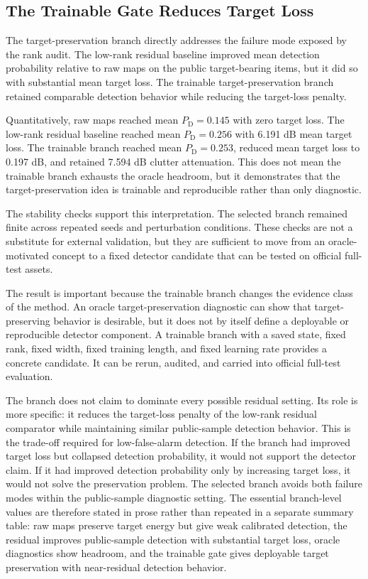 \documentclass[journal]{IEEEtran}
\begin{document}
\subsection{The Trainable Gate Reduces Target Loss}

The target-preservation branch directly addresses the failure mode exposed by the rank audit. The low-rank residual baseline improved mean detection probability relative to raw maps on the public target-bearing items, but it did so with substantial mean target loss. The trainable target-preservation branch retained comparable detection behavior while reducing the target-loss penalty.

Quantitatively, raw maps reached mean $P_{\mathrm{D}}=0.145$ with zero target loss. The low-rank residual baseline reached mean $P_{\mathrm{D}}=0.256$ with 6.191 dB mean target loss. The trainable branch reached mean $P_{\mathrm{D}}=0.253$, reduced mean target loss to 0.197 dB, and retained 7.594 dB clutter attenuation. This does not mean the trainable branch exhausts the oracle headroom, but it demonstrates that the target-preservation idea is trainable and reproducible rather than only diagnostic.

The stability checks support this interpretation. The selected branch remained finite across repeated seeds and perturbation conditions. These checks are not a substitute for external validation, but they are sufficient to move from an oracle-motivated concept to a fixed detector candidate that can be tested on official full-test assets.

The result is important because the trainable branch changes the evidence class of the method. An oracle target-preservation diagnostic can show that target-preserving behavior is desirable, but it does not by itself define a deployable or reproducible detector component. A trainable branch with a saved state, fixed rank, fixed width, fixed training length, and fixed learning rate provides a concrete candidate. It can be rerun, audited, and carried into official full-test evaluation.

The branch does not claim to dominate every possible residual setting. Its role is more specific: it reduces the target-loss penalty of the low-rank residual comparator while maintaining similar public-sample detection behavior. This is the trade-off required for low-false-alarm detection. If the branch had improved target loss but collapsed detection probability, it would not support the detector claim. If it had improved detection probability only by increasing target loss, it would not solve the preservation problem. The selected branch avoids both failure modes within the public-sample diagnostic setting. The essential branch-level values are therefore stated in prose rather than repeated in a separate summary table: raw maps preserve target energy but give weak calibrated detection, the residual improves public-sample detection with substantial target loss, oracle diagnostics show headroom, and the trainable gate gives deployable target preservation with near-residual detection behavior.
\end{document}
